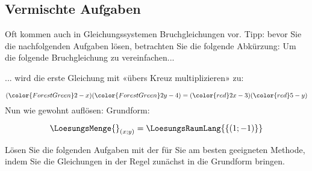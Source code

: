
\subsection{Vermischte Aufgaben}
Oft kommen auch in Gleichungssystemen Bruchgleichungen vor. Tipp:
bevor Sie die nachfolgenden Aufgaben lösen, betrachten Sie die folgende
Abkürzung: Um die folgende Bruchgleichung zu vereinfachen...

... wird die erste Gleichung mit «übers Kreuz multiplizieren» zu:

$$({\color{ForestGreen}2-x})({\color{ForestGreen}2y-4}) =
({\color{red}2x-3})({\color{red}5-y})$$
Nun wie gewohnt auflösen:
Grundform:

$$\LoesungsMenge{}_{(x;y)} = \LoesungsRaumLang{\{(1; -1)\}}$$

Lösen Sie die folgenden Aufgaben mit der für Sie am besten geeigneten Methode, indem Sie die
Gleichungen in der Regel zunächst in die Grundform bringen.


\newpage
